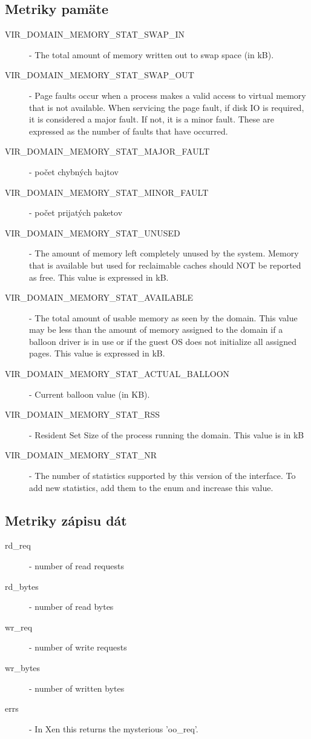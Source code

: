 \documentclass[11pt,final,oneside]{fithesis}
\begin{document}
\subsection{Metriky pamäte}
\begin{description}
\item[VIR_DOMAIN_MEMORY_STAT_SWAP_IN] - The total amount of memory written out to swap space (in kB).
\item[VIR_DOMAIN_MEMORY_STAT_SWAP_OUT] - Page faults occur when a process makes a valid access to virtual memory that is not available. When servicing the page fault, if disk IO is required, it is considered a major fault. If not, it is a minor fault. These are expressed as the number of faults that have occurred.
\item[VIR_DOMAIN_MEMORY_STAT_MAJOR_FAULT] - počet chybných bajtov
\item[VIR_DOMAIN_MEMORY_STAT_MINOR_FAULT] - počet prijatých paketov
\item[VIR_DOMAIN_MEMORY_STAT_UNUSED] - The amount of memory left completely unused by the system. Memory that is available but used for reclaimable caches should NOT be reported as free. This value is expressed in kB.
\item[VIR_DOMAIN_MEMORY_STAT_AVAILABLE] - The total amount of usable memory as seen by the domain. This value may be less than the amount of memory assigned to the domain if a balloon driver is in use or if the guest OS does not initialize all assigned pages. This value is expressed in kB.
\item[VIR_DOMAIN_MEMORY_STAT_ACTUAL_BALLOON] - Current balloon value (in KB).
\item[VIR_DOMAIN_MEMORY_STAT_RSS] - Resident Set Size of the process running the domain. This value is in kB
\item[VIR_DOMAIN_MEMORY_STAT_NR] - The number of statistics supported by this version of the interface. To add new statistics, add them to the enum and increase this value.
\end{description}

\subsection{Metriky zápisu dát}
\begin{description}
\item[rd_req] - number of read requests
\item[rd_bytes] - number of read bytes
\item[wr_req] - number of write requests
\item[wr_bytes] - number of written bytes
\item[errs] - In Xen this returns the mysterious 'oo_req'.
\end{description}
\end{document}
